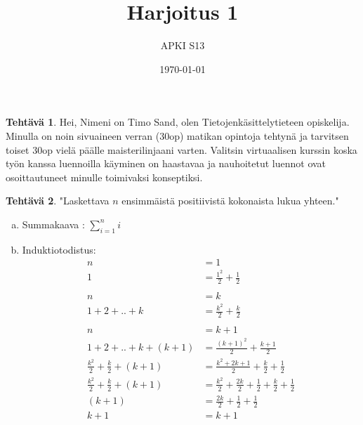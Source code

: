 \documentclass[12pt,a4paper,final]{article}
\title{Harjoitus 1}
\author{APKI S13}
\date{\today}
\theoremstyle{definition}
\newtheorem{ex}{Tehtävä}
\begin{document}
\ifpdf
{}
\else
{}
\fi

\maketitle

\begin{ex}
  Hei,
  Nimeni on Timo Sand, olen Tietojenkäsittelytieteen opiskelija. Minulla on noin sivuaineen verran (30op) matikan opintoja tehtynä ja tarvitsen toiset 30op vielä päälle maisterilinjaani varten.
  Valitsin virtuaalisen kurssin koska työn kanssa luennoilla käyminen on haastavaa ja nauhoitetut luennot ovat osoittautuneet minulle toimivaksi konseptiksi.
\end{ex}

\begin{ex}
  "Laskettava $n$ ensimmäistä positiivistä kokonaista lukua yhteen."
  \begin{enumerate}[(a)]
    \item Summakaava : $ \sum_{i=1}^n i$
    \item Induktiotodistus:
      \begin{align*}
        n &= 1 \\
        1 &= \frac{1^2}{2} + \frac{1}{2} \\
        \\
        n &= k \\
        1 + 2 + .. + k &= \frac{k^2}{2} + \frac{k}{2} \\
        \\
        n &= k+1 \\
        1 + 2 + .. + k + (k+1) &= \frac{(k+1)^2}{2} + \frac{k+1}{2} \\
        \frac{k^2}{2} + \frac{k}{2} + (k+1) &= \frac{k^2 + 2k + 1}{2} + \frac{k}{2} + \frac{1}{2} \\
        \frac{k^2}{2} + \frac{k}{2} + (k+1) &= \frac{k^2}{2} + \frac{2k}{2} + \frac{1}{2} + \frac{k}{2} + \frac{1}{2} \\
         (k+1) &= \frac{2k}{2} + \frac{1}{2} + \frac{1}{2} \\
         k + 1 &= k + 1\\
      \end{align*}
  \end{enumerate}
\end{ex}
\end{document}

